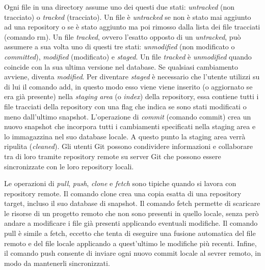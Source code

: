 Ogni file in una directory assume uno dei questi due stati:
\emph{untracked} (non tracciato) o \emph{tracked} (tracciato).
Un file è \emph{untracked} se non è stato mai aggiunto ad una repository o se è stato
aggiunto ma poi rimosso dalla lista dei file tracciati (comando \textsf{rm}).
Un file \emph{tracked}, ovvero l’esatto opposto di un \emph{untracked}, può assumere a sua volta uno di questi tre
stati: \emph{unmodified} (non modificato o \emph{committed}), \emph{modified} (modificato) e \emph{staged}.
Un file \emph{tracked} è \emph{unmodified} quando coincide con la sua ultima versione nel database.
Se qualsiasi cambiamento avviene, diventa \emph{modified}.
Per diventare \emph{staged} è necessario che l’utente utilizzi su di lui il comando \textsf{add},
in questo modo esso viene viene inserito (o aggiornato se era già presente) nella \emph{staging area}
(o \emph{index}) della repository, essa contiene tutti i file tracciati della repository con una flag
che indica se sono stati modificati o meno dall’ultimo snapshot.
L’operazione di \emph{commit} (comando \textsf{commit}) crea un nuovo snapshot che incorpora
tutti i cambiamenti specificati nella staging area e lo immagazzina nel suo database locale.
A questo punto la staging area verrà ripulita (\emph{cleaned}).
Gli utenti Git possono condividere informazioni e collaborare tra di loro tramite repository remote
su server Git che possono essere sincronizzate con le loro repository locali.

Le operazioni di \emph{pull}, \emph{push}, \emph{clone} e \emph{fetch}
sono tipiche quando si lavora con repository remote.
Il comando \textsf{clone} crea una copia esatta di una repository target,
incluso il suo database di snapshot.
Il comando \textsf{fetch} permette di scaricare le risorse di un progetto remoto che non sono
presenti in quello locale, senza però andare a modificare i file già presenti
applicando eventuali modifiche.
Il comando \textsf{pull} è simile a \textsf{fetch}, eccetto che tenta di eseguire una fusione
automatica del file remoto e del file locale applicando a quest’ultimo le modifiche più recenti.
Infine, il comando \textsf{push} consente di inviare ogni nuovo commit locale al sevrer remoto,
in modo da mantenerli sincronizzati.


